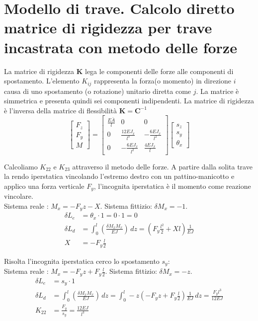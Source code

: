 \section{Modello di trave. Calcolo diretto matrice di rigidezza per trave incastrata con metodo delle forze}


\begin{definizioneBox}
    La matrice di rigidezza $\boldsymbol{K}$ lega le componenti delle forze alle componenti di spostamento. L'elemento $K_{ij} $ rappresenta la forza(o momento) in direzione $i$ causa di uno spostamento (o rotazione) unitario diretta come $j$. La matrice è simmetrica e presenta quindi sei componenti  indipendenti.
    La matrice di rigidezza è l'inversa della matrice di flessibilità $\boldsymbol{K}  = \boldsymbol{C}^{-1}$
    \begin{equation*}
    \begin{bmatrix}
F_z\\
F_y \\
M
\end{bmatrix}
=
\begin{bmatrix}
\frac{E\bar{A}}{l} & 0 & 0 \\
0 & \frac{12EJ_x}{l^3} & -\frac{6EJ_x}{l^2} \\
0 & -\frac{6EJ_x}{l^2} & \frac{4EJ_x}{l}
\end{bmatrix}
\begin{bmatrix}
s_z \\
s_y \\
\theta_x
\end{bmatrix}
\end{equation*}
\end{definizioneBox}


 Calcoliamo $K_{22}$ e $K_{23}$ attraverso il metodo delle forze. A partire dalla solita trave la rendo iperstatica vincolando l'estremo destro con un pattino-manicotto  e applico una forza verticale $F_y$, l'incognita iperstatica è il momento come reazione vincolare.\\
    Sistema reale :  $M_x =-F_yz-X$. Sistema fittizio: $\delta M_x = -1$. 
    \begin{align*}
        \delta L_e &= \theta_x \cdot 1 = 0\cdot 1 = 0 \\
        \delta L_d &= \int_0^l \left(   \frac{\delta M_xM_x}{EJ}\right)\,dz 
        = \left(   F_y\frac{l^2}{2} +Xl\right)\frac{1}{EJ}\\
       X&= -F_y\frac{l}{2} 
    \end{align*}

    Risolta l'incognita iperstatica cerco lo spostamento $s_y$:\\
    Sistema reale :  $M_x =-F_yz + F_y\frac{l}{2} $. Sistema fittizio: $\delta M_x = -z$. 
    \begin{align*}
        \delta L_e &= s_y \cdot 1  \\
        \delta L_d &= \int_0^l \left(   \frac{\delta M_xM_x}{EJ}\right)\,dz 
        = \int_0^l -z\left(   -F_yz + F_y\frac{l}{2}  \right)   \frac{1}{EJ}\,dz 
        = \frac{F_y l^3}{12EJ}\\
       K_{22} &= \frac{F_y}{s_y}  = \frac{12EJ}{l^3}
    \end{align*}

